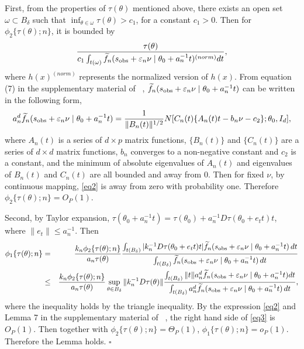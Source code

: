 \documentclass{article}
\begin{document}
	First, from the properties of $\tau(\theta)$ mentioned above, there exists an open set $\omega\subset B_{\delta}$
	such that $\inf_{\theta\in\omega}\tau(\theta)>c_{1}$, for a constant
	$c_{1}>0$. Then for $\phi_{2}\{\tau(\theta);n\}$, it is bounded
	by 
	\[
	\frac{\tau(\theta)}{c_{1}\int_{t(\omega)}\widetilde{f}_{n}(s_{{\rm obs}}+\varepsilon_{n}\nu\mid\theta_{0}+a_{n}^{-1}t)^{(norm)}dt},
	\]
	where $h(x)^{(norm)}$ represents the normalized version of $h(x)$.
	From equation (7) in the supplementary material of ~\cite{Li2016},
	$\widetilde{f}_{n}(s_{{\rm obs}}+\varepsilon_{n}\nu\mid\theta_0+a_{n}^{-1}t)$
	can be written in the following form, 
	\begin{eqnarray}
	a_{n}^{d}\widetilde{f}_{n}(s_{{\rm obs}}+\varepsilon_{n}\nu\mid\theta_0+a_{n}^{-1}t)=\frac{1}{\|B_{n}(t)\|^{1/2}}N[C_{n}(t)\{A_{n}(t)t-b_{n}\nu-c_{2}\};\theta_0,I_{d}],\label{eq2}
	\end{eqnarray}
	where $A_{n}(t)$ is a series of $d\times p$ matrix functions, $\{B_{n}(t)\}$
	and $\{C_{n}(t)\}$ are a series of $d\times d$ matrix functions,
	$b_{n}$ converges to a non-negative constant and $c_{2}$ is a constant,
	and the minimum of absolute eigenvalues of $A_{n}(t)$ and eigenvalues
	of $B_{n}(t)$ and $C_{n}(t)$ are all bounded and away from $0$.
	Then for fixed $\nu$, by continuous mapping, \eqref{eq2} is away
	from zero with probability one. Therefore $\phi_{2}\{\tau(\theta);n\}=O_{P}(1)$.
	
	Second, by Taylor expansion, $\tau(\theta_0+a_{n}^{-1}t)=\tau(\theta_0)+a_{n}^{-1}D\tau(\theta_0+e_{t}t)t$,
	where $\|e_{t}\|\leq a_{n}^{-1}$. Then 
	\begin{eqnarray}
	\phi_{1}\{\tau(\theta);n\} & = & \frac{k_{n}\phi_{2}\{\tau(\theta);n\}}{a_{n}\tau(\theta)}\frac{\int_{t(B_{\delta})}|k_{n}^{-1}D\tau(\theta_0+e_{t}t)t|\widetilde{f}_{n}(s_{{\rm obs}}+\varepsilon_{n}\nu\mid\theta_0+a_{n}^{-1}t)\,dt}{\int_{t(B_{\delta})}\widetilde{f}_{n}(s_{{\rm obs}}+\varepsilon_{n}\nu\mid\theta_0+a_{n}^{-1}t)\,dt}\nonumber \\
	& \leq & \frac{k_{n}\phi_{2}\{\tau(\theta);n\}}{a_{n}\tau(\theta)}\sup_{\theta\in B_{\delta}}\|k_{n}^{-1}D\tau(\theta)\|\frac{\int_{t(B_{\delta})}\|t\|a_{n}^{d}\widetilde{f}_{n}(s_{{\rm obs}}+\varepsilon_{n}\nu\mid\theta_0+a_{n}^{-1}t)dt}{\int_{t(B_{\delta})}a_{n}^{d}\widetilde{f}_{n}(s_{{\rm obs}}+\varepsilon_{n}\nu\mid\theta_0+a_{n}^{-1}t)\,dt},\label{eq3}
	\end{eqnarray}
	where the inequality holds by the triangle inequality. By the expression
	\eqref{eq2} and Lemma 7 in the supplementary material of ~\cite{Li2016},
	the right hand side of \eqref{eq3} is $O_{P}(1)$. Then together
	with $\phi_{2}\{\tau(\theta);n\}=\Theta_{P}(1)$, $\phi_{1}\{\tau(\theta);n\}=o_{P}(1).$
	Therefore the Lemma holds.
	\hfill{$\square$} 
\end{document}
